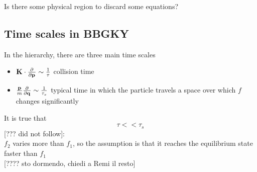 
Is there some physical region to discard some equations?
\subsection{Time scales in BBGKY}
In the hierarchy, there are three main time scales
\begin{itemize}
    \item $\mathbf{K}\cdot\pdv[]{}{\mathbf{p}}\sim \frac{1}{\tau}$ collision time
    \item $\frac{\mathbf{p}}{m}\pdv[]{}{\mathbf{q}}\sim \frac{1}{\tau_s}$ typical
        time in which the particle travels a space over which $f$ changes
        significantly
\end{itemize}
It is true that
$$\tau<<\tau_s$$
[??? did not follow]:\\ $f_2$ varies more than $f_1$, so the assumption is that
it reaches the equilibrium state faster than $f_1$ \\

[???? sto dormendo, chiedi a Remi il resto]


